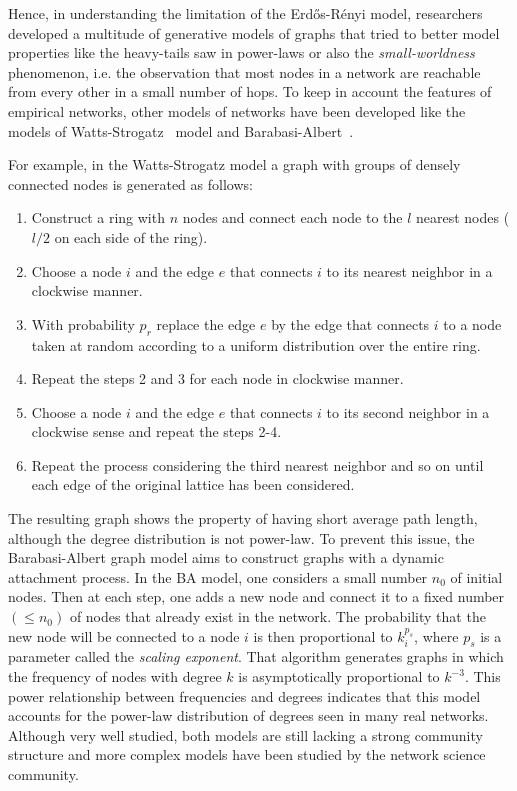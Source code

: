 Hence, in understanding the limitation of the Erd\H{o}s-Rényi model, researchers developed a multitude of generative models of graphs that tried to better model properties like the heavy-tails saw in power-laws or also the \emph{small-worldness} phenomenon, i.e. the observation that most nodes in a network are reachable from every other in a small number of hops.
To keep in account the features of empirical networks, other models of networks have been developed like the models of Watts-Strogatz~\cite{watts1998} model and Barabasi-Albert~\cite{barabasi1999}.

For example, in the Watts-Strogatz model a graph with groups of densely connected nodes is generated as follows:
\begin{enumerate}
\item Construct a ring with $n$ nodes and connect each node to the $l$ nearest nodes ($l/2$ on each side of the ring).
\item Choose a node $i$ and the edge $e$ that connects $i$ to its nearest neighbor in a clockwise manner.
\item With probability $p_r$ replace the edge $e$ by the edge that connects $i$ to a node taken at random according to a uniform distribution over the entire ring.
\item Repeat the steps 2 and 3 for each node in clockwise manner.
\item Choose a node $i$ and the edge $e$ that connects $i$ to its second neighbor in a clockwise sense and repeat the steps 2-4.
\item Repeat the process considering the third nearest neighbor and so on until each edge of the original lattice has been considered.
\end{enumerate}

The resulting graph shows the property of having short average path length, although the degree distribution is not power-law.
To prevent this issue, the Barabasi-Albert graph model aims to construct graphs with a dynamic attachment process.
In the BA model, one considers a small number $n_0$ of initial nodes. Then at each step, one adds a new node and connect it to a fixed number $(\leq n_0)$ of nodes that already exist in the network. The probability that the new node will be connected to a node $i$ is then proportional to $k_i^{p_s}$,  where $p_s$ is a parameter called the \emph{scaling exponent}. That algorithm generates graphs in which the frequency of nodes with degree $k$ is asymptotically proportional to ${k}^{-3}$. This power relationship between frequencies and degrees indicates that this model accounts for the power-law distribution of degrees seen in many real networks.
Although very well studied, both models are still lacking a strong community structure and more complex models have been studied by the network science community.

